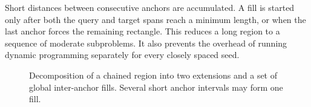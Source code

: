 Short distances between consecutive anchors are accumulated. A fill is
started only after both the query and target spans reach a minimum length, or
when the last anchor forces the remaining rectangle. This reduces a long
region to a sequence of moderate subproblems. It also prevents the overhead of
running dynamic programming separately for every closely spaced seed.

\begin{figure}[htbp]
\centering
{}
\caption{Decomposition of a chained region into two extensions and a set of
global inter-anchor fills. Several short anchor intervals may form one fill.}
\label{fig:three-phase-alignment}
\end{figure}

